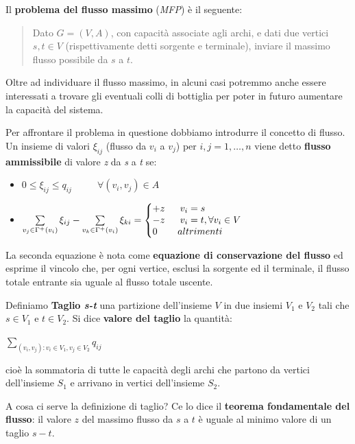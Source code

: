 \documentclass[11pt]{book}
\makeatletter
\newenvironment{sistema}%
{\left\lbrace\begin{array}{@{}l@{}}}%
{\end{array}\right.}
\makeatother
\begin{document}
Il {\bf problema del flusso massimo} ({\em MFP}) \`e il seguente:


\begin{quote}
Dato $G=(V,A)$, con capacit\`a associate agli archi, e dati due
vertici $s, t \in V$ (rispettivamente detti sorgente e terminale),
inviare il massimo flusso possibile da $s$ a $t$.
\end{quote}


Oltre ad individuare il flusso massimo, in alcuni casi potremmo anche
essere interessati a trovare gli eventuali colli di bottiglia per
poter in futuro aumentare la capacit\`a del sistema.


Per affrontare il problema in questione dobbiamo introdurre il
concetto di flusso. Un insieme di valori $\xi_{ij}$ (flusso da $v_i$
a $v_j$) per $i,j=1,\dots,n$ viene detto {\bf flusso ammissibile} di
valore {\em z} da {\em s} a {\em t} se:


\begin{itemize}
\item $0 \leq \xi_{ij} \leq q_{ij}\phantom{aaaaa}\forall (v_i, v_j) \in A$
\item $\sum\limits_{v_j \in \Gamma^+ (v_i)}\xi_{ij} - \sum\limits_{v_k \in \Gamma^+ (v_i)}\xi_{ki} = \begin{sistema}
+z\phantom{aaa}v_i=s\\
-z\phantom{aaa}v_i=t, \forall v_i \in V\\
0\phantom{aaaa}altrimenti
\end{sistema}$
\end{itemize}


La seconda equazione \`e nota come {\bf equazione di conservazione del
  flusso} ed esprime il vincolo che, per ogni vertice, esclusi la
sorgente ed il terminale, il flusso totale entrante sia uguale al
flusso totale uscente.


Definiamo {\bf Taglio {\em s-t}} una partizione dell'insieme $V$ in
due insiemi $V_1$ e $V_2$ tali che $s \in V_1$ e $t \in V_2$. Si dice
{\bf valore del taglio} la quantit\`a:
\begin{center}
$\sum\limits_{(v_i,v_j) : v_i \in V_1, v_j \in V_2} q_{ij}$
\end{center}
cio\`e la sommatoria di tutte le capacit\`a degli archi che partono da
vertici dell'insieme $S_1$ e arrivano in vertici dell'insieme $S_2$.


A cosa ci serve la definizione di taglio? Ce lo dice il {\bf teorema
  fondamentale del flusso}: il valore $z$ del massimo flusso da $s$ a
$t$ \`e uguale al minimo valore di un taglio $s-t$.
\end{document}
